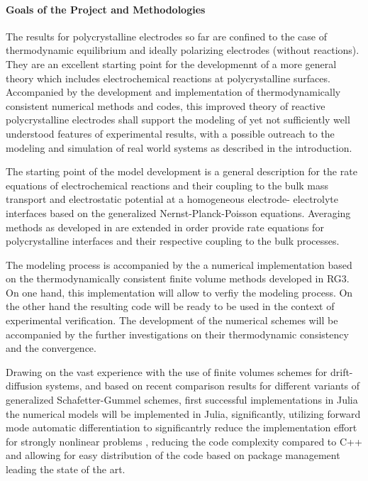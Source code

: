 \documentclass[a4paper,10pt]{article}
\begin{document}
\paragraph{Goals of the Project and Methodologies}

The results for polycrystalline electrodes  so far are confined to the
case of  thermodynamic equilibrium  and ideally  polarizing electrodes
(without  reactions). They  are an  excellent starting  point for  the
developmennt of  a more general theory  which includes electrochemical
reactions at polycrystalline surfaces.  Accompanied by the development
and implementation  of thermodynamically consistent  numerical methods
and codes, this improved theory of reactive polycrystalline electrodes
shall support  the modeling  of yet  not sufficiently  well understood
features  of experimental  results, with  a possible  outreach to  the
modeling  and simulation  of real  world systems  as described  in the
introduction.




The starting point  of the model development is  a general description
for the rate  equations of electrochemical reactions and their coupling to the bulk mass transport
and electrostatic potential at a homogeneous
electrode- electrolyte  interfaces based on the generalized Nernst-Planck-Poisson equations. Averaging methods as  developed in
\cite{JES}  are   extended  in   order  provide  rate   equations  for
polycrystalline interfaces  and their respective coupling to the bulk processes.

The modeling process is accompanied by the a numerical implementation based on the
thermodynamically consistent finite volume methods developed in RG3.
On one hand, this implementation will allow to verfiy the modeling process. On the other
hand the resulting code will be ready to be used in the context of experimental verification.
The development of the numerical schemes will be accompanied by the further investigations
on their thermodynamic consistency and the convergence.

Drawing on the vast experience with the use of finite volumes schemes for drift-diffusion systems,
and based on recent comparison results for different variants of generalized Schafetter-Gummel
schemes, first successful implementations in Julia \cite{VagnerEtAl2019, VoronoiFVM}
the numerical models will be implemented in  Julia, significantly, utilizing forward mode automatic
differentiation to significantrly reduce the implementation
effort for strongly nonlinear problems \cite{VoronoiFVM}, reducing the code complexity compared
to C++ and allowing for easy distribution of the code based on package management leading the
state of the art.
\end{document}
